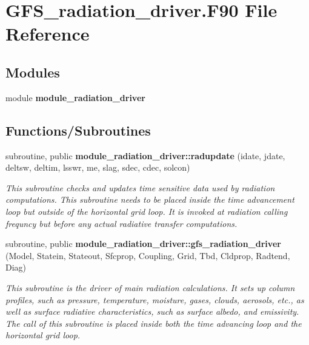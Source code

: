 \section{G\+F\+S\+\_\+radiation\+\_\+driver.\+F90 File Reference}
\label{_g_f_s__radiation__driver_8_f90}
\subsection*{Modules}
\begin{DoxyCompactItemize}
\item 
module \textbf{ module\+\_\+radiation\+\_\+driver}
\end{DoxyCompactItemize}
\subsection*{Functions/\+Subroutines}
\textbf{ }\par
\begin{DoxyCompactItemize}
\item 
subroutine, public \textbf{ module\+\_\+radiation\+\_\+driver\+::radupdate} (idate, jdate, deltsw, deltim, lsswr, me, slag, sdec, cdec, solcon)
\begin{DoxyCompactList}\small\item\em This subroutine checks and updates time sensitive data used by radiation computations. This subroutine needs to be placed inside the time advancement loop but outside of the horizontal grid loop. It is invoked at radiation calling frequncy but before any actual radiative transfer computations. \end{DoxyCompactList}\end{DoxyCompactItemize}

\textbf{ }\par
\begin{DoxyCompactItemize}
\item 
subroutine, public \textbf{ module\+\_\+radiation\+\_\+driver\+::gfs\+\_\+radiation\+\_\+driver} (Model, Statein, Stateout, Sfcprop, Coupling, Grid, Tbd, Cldprop, Radtend, Diag)
\begin{DoxyCompactList}\small\item\em This subroutine is the driver of main radiation calculations. It sets up column profiles, such as pressure, temperature, moisture, gases, clouds, aerosols, etc., as well as surface radiative characteristics, such as surface albedo, and emissivity. The call of this subroutine is placed inside both the time advancing loop and the horizontal grid loop. \end{DoxyCompactList}\end{DoxyCompactItemize}

